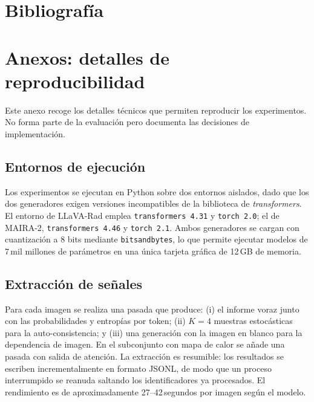 \documentclass[12pt,a4paper]{report}
\begin{document}






\tableofcontents
\listoffigures
\listoftables








\chapter*{Bibliografía}
\printbibliography[heading=none]

\appendix
\chapter{Anexos: detalles de reproducibilidad}

Este anexo recoge los detalles técnicos que permiten reproducir los experimentos. No forma parte de
la evaluación pero documenta las decisiones de implementación.

\section{Entornos de ejecución}
Los experimentos se ejecutan en Python sobre dos entornos aislados, dado que los dos generadores
exigen versiones incompatibles de la biblioteca de \textit{transformers}. El entorno de LLaVA-Rad
emplea \texttt{transformers 4.31} y \texttt{torch 2.0}; el de MAIRA-2, \texttt{transformers 4.46} y
\texttt{torch 2.1}. Ambos generadores se cargan con cuantización a 8 bits mediante
\texttt{bitsandbytes}, lo que permite ejecutar modelos de 7\,mil millones de parámetros en una única
tarjeta gráfica de 12\,GB de memoria.

\section{Extracción de señales}
Para cada imagen se realiza una pasada que produce: (i) el informe voraz junto con las probabilidades
y entropías por token; (ii) $K=4$ muestras estocásticas para la auto-consistencia; y (iii) una
generación con la imagen en blanco para la dependencia de imagen. En el subconjunto con mapa de calor
se añade una pasada con salida de atención. La extracción es resumible: los resultados se
escriben incrementalmente en formato JSONL, de modo que un proceso interrumpido se reanuda saltando
los identificadores ya procesados. El rendimiento es de aproximadamente 27--42\,segundos por imagen
según el modelo.
\end{document}
